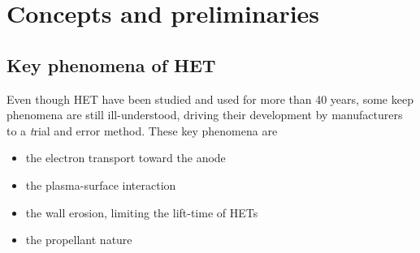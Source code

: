 



\chapter*{Concepts and preliminaries}
\label{ch-concepts}







\section{Key phenomena of \ac{HET}}

Even though \ac{HET} have been studied and used for more than 40 years, some keep phenomena are still ill-understood, driving their development by manufacturers to a {\emph trial and error} method.
These key phenomena are
\begin{itemize}
  \item the electron transport toward the anode
  \item the plasma-surface interaction 
  \item the wall erosion, limiting the lift-time of \ac{HET}s
  \item the propellant nature
\end{itemize}

